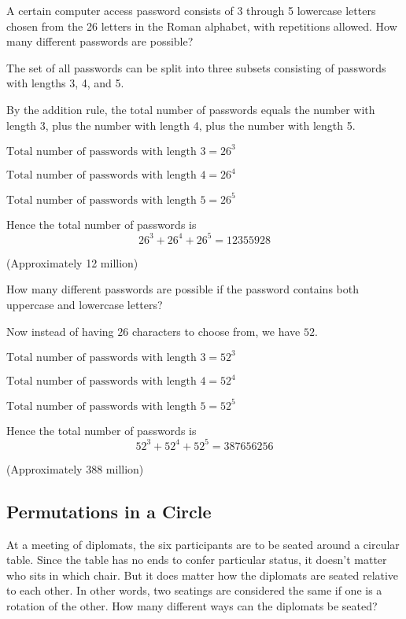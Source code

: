 \documentclass[11pt,a4paper]{book}
\begin{document}
\begin{example}

A certain computer access password consists of 3 through 5 lowercase
letters chosen from the 26 letters in the Roman alphabet, with repetitions
allowed. How many different passwords are possible? 

The set of all passwords can be split into three subsets consisting
of passwords with lengths 3, 4, and 5. 

By the addition rule, the total number of passwords equals the number
with length 3, plus the number with length 4, plus the number with
length 5.

$\text{Total number of passwords with length 3}=26^{3}$

$\text{Total number of passwords with length 4}=26^{4}$

$\text{Total number of passwords with length 5}=26^{5}$

Hence the total number of passwords is 
\[
26^{3}+26^{4}+26^{5}=12355928
\]

(Approximately 12 million)

How many different passwords are possible if the password contains
both uppercase and lowercase letters? 

Now instead of having $26$ characters to choose from, we have $52$.

$\text{Total number of passwords with length 3}=52^{3}$

$\text{Total number of passwords with length 4}=52^{4}$

$\text{Total number of passwords with length 5}=52^{5}$

Hence the total number of passwords is 
\[
52^{3}+52^{4}+52^{5}=387656256
\]

(Approximately 388 million)

\end{example}

\subsection{Permutations in a Circle }

At a meeting of diplomats, the six participants are to be seated around
a circular table. Since the table has no ends to confer particular
status, it doesn\textquoteright t matter who sits in which chair.
But it does matter how the diplomats are seated relative to each other.
In other words, two seatings are considered the same if one is a rotation
of the other. How many different ways can the diplomats be seated?
\end{document}
